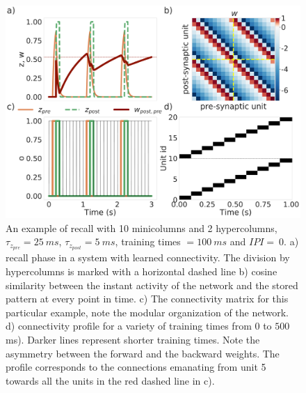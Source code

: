 \documentclass[10pt,a4paper]{article}
\begin{document}
\begin{figure}[H]
\centering
\includegraphics[scale=0.20]{recall_example.pdf}
\caption{An example of recall with 10 minicolumns and 2 hypercolumns, $\tau_{z_{pre}} = 25 \: ms$, $\tau_{z_{post}}=5 \: ms$, training times $=100 \: ms$ and $IPI = \: 0 $. a) recall phase in a system with learned connectivity. The division by hypercolumns is marked with a horizontal dashed line b) cosine similarity between the instant activity of the network and the stored pattern at every point in time. c) The connectivity matrix for this particular example, note the modular organization of the network.  d) connectivity profile for a variety of training times from $0$ to $500$ ms). Darker lines represent shorter training times. Note the asymmetry between the forward and the backward weights. The profile corresponds to the connections emanating from unit 5 towards all the units in the red dashed line in c).}
\label{fig:recall_example}
\end{figure}

\end{document}
